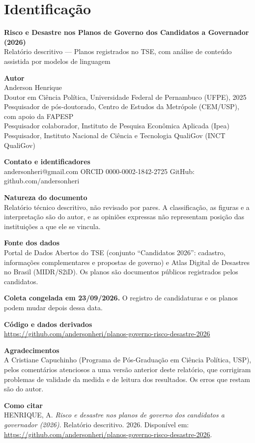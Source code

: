 \clearpage
\section*{Identificação}

\textbf{Risco e Desastre nos Planos de Governo dos Candidatos a Governador (2026)}\\
Relatório descritivo --- Planos registrados no TSE, com análise de conteúdo assistida por modelos de linguagem

\bigskip
\textbf{Autor}\\
Anderson Henrique\\
Doutor em Ciência Política, Universidade Federal de Pernambuco (UFPE), 2025\\
Pesquisador de pós-doutorado, Centro de Estudos da Metrópole (CEM/USP), com apoio da FAPESP\\
Pesquisador colaborador, Instituto de Pesquisa Econômica Aplicada (Ipea)\\
Pesquisador, Instituto Nacional de Ciência e Tecnologia QualiGov (INCT QualiGov)

\medskip
\textbf{Contato e identificadores}\\
andersonheri@gmail.com \textperiodcentered{} ORCID 0000-0002-1842-2725 \textperiodcentered{} GitHub: github.com/andersonheri

\medskip
\textbf{Natureza do documento}\\
Relatório técnico descritivo, não revisado por pares. A classificação, as figuras e a interpretação são do autor, e as opiniões expressas não representam posição das instituições a que ele se vincula.

\medskip
\textbf{Fonte dos dados}\\
Portal de Dados Abertos do TSE (conjunto ``Candidatos 2026'': cadastro, informações complementares e propostas de governo) e Atlas Digital de Desastres no Brasil (MIDR/S2iD). Os planos são documentos públicos registrados pelos candidatos.

\medskip
\textbf{Coleta congelada em 23/09/2026.} O registro de candidaturas e os planos podem mudar depois dessa data.

\medskip
\textbf{Código e dados derivados}\\
\url{https://github.com/andersonheri/planos-governo-risco-desastre-2026}

\medskip
\textbf{Agradecimentos}\\
A Cristiane Capuchinho (Programa de Pós-Graduação em Ciência Política, USP), pelos comentários atenciosos a uma versão anterior deste relatório, que corrigiram problemas de validade da medida e de leitura dos resultados. Os erros que restam são do autor.

\medskip
\textbf{Como citar}\\
HENRIQUE, A. \textit{Risco e desastre nos planos de governo dos candidatos a governador (2026)}. Relatório descritivo. 2026. Disponível em: \url{https://github.com/andersonheri/planos-governo-risco-desastre-2026}.

\clearpage
